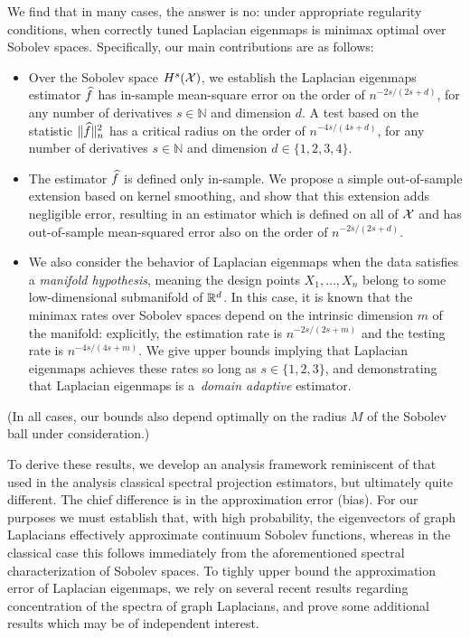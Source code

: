 We find that in many cases, the answer is no: under appropriate regularity conditions, when correctly tuned Laplacian eigenmaps is minimax optimal over Sobolev spaces. Specifically, our main contributions are as follows:
\begin{itemize}
	\item Over the Sobolev space $H^{s}(\mathcal{X})$, we establish the Laplacian eigenmaps estimator $\widehat{f}$ has in-sample mean-square error on the order of $n^{-2s/(2s + d)}$, for any number of derivatives $s \in \mathbb{N}$ and dimension $d$. A test based on the statistic $\|\widehat{f}\|_n^2$ has a critical radius on the order of $n^{-4s/(4s + d)}$, for any number of derivatives $s \in \mathbb{N}$ and dimension $d \in \{1,2,3,4\}$. 
	\item The estimator $\widehat{f}$ is defined only in-sample. We propose a simple out-of-sample extension based on kernel smoothing, and show that this extension adds negligible error, resulting in an estimator which is defined on all of $\mathcal{X}$ and has out-of-sample mean-squared error also on the order of $n^{-2s/(2s + d)}$.
	\item We also consider the behavior of Laplacian eigenmaps when the data satisfies a \emph{manifold hypothesis}, meaning the design points $X_1,\ldots,X_n$ belong to some low-dimensional submanifold of $\mathbb{R}^d$. In this case, it is known that the minimax rates over Sobolev spaces depend on the intrinsic dimension $m$ of the manifold: explicitly, the estimation rate is $n^{-2s/(2s + m)}$ and the testing rate is $n^{-4s/(4s + m)}$. We give upper bounds implying that Laplacian eigenmaps achieves these rates so long as $s \in \{1,2,3\}$, and demonstrating that Laplacian eigenmaps is a~\emph{domain adaptive} estimator.
\end{itemize}
(In all cases, our bounds also depend optimally on the radius $M$ of the Sobolev ball under consideration.)

To derive these results, we develop an analysis framework reminiscent of that used in the analysis classical spectral projection estimators, but ultimately quite different. The chief difference is in the approximation error (bias). For our purposes we must establish that, with high probability, the eigenvectors of graph Laplacians effectively approximate continuum Sobolev functions, whereas in the classical case this follows immediately from the aforementioned spectral characterization of Sobolev spaces. To tighly upper bound the approximation error of Laplacian eigenmaps, we rely on several recent results regarding concentration of the spectra of graph Laplacians, and prove some additional results which may be of independent interest. 

